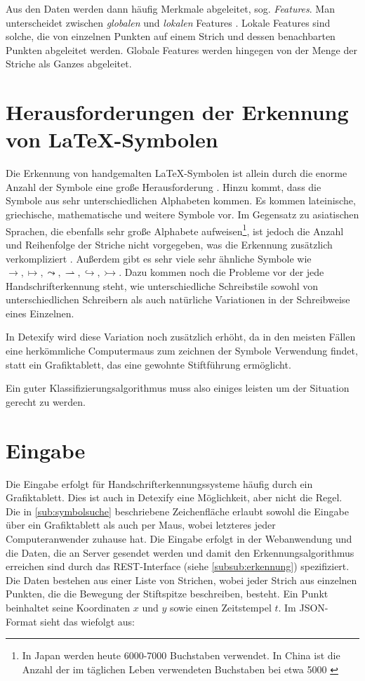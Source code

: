 Aus den Daten werden dann häufig Merkmale abgeleitet, sog. \emph{Features}. Man unterscheidet zwischen \emph{globalen} und \emph{lokalen} Features \cite{Tapia:2007p9160}. Lokale Features sind solche, die von einzelnen Punkten auf einem Strich und dessen benachbarten Punkten abgeleitet werden. Globale Features werden hingegen von der Menge der Striche als Ganzes abgeleitet.

\section[Herausforderungen]{Herausforderungen der Erkennung von \LaTeX-Symbolen}\label{sec:herausforderungen} Die Erkennung von handgemalten \LaTeX-Symbolen ist allein durch die enorme Anzahl der Symbole eine große Herausforderung \cite{Koerich:2003p1562}. Hinzu kommt, dass die Symbole aus sehr unterschiedlichen Alphabeten kommen. Es kommen lateinische, griechische, mathematische und weitere Symbole vor. Im Gegensatz zu asiatischen Sprachen, die ebenfalls sehr große Alphabete aufweisen\footnote{In Japan werden heute 6000-7000 Buchstaben verwendet. In China ist die Anzahl der im täglichen Leben verwendeten Buchstaben bei etwa 5000 \cite{Jaeger:2003p1097}}, ist jedoch die Anzahl und Reihenfolge der Striche nicht vorgegeben, was die Erkennung zusätzlich verkompliziert \cite{Watt:2005p1816}. Außerdem gibt es sehr viele sehr ähnliche Symbole wie $\rightarrow,\mapsto,\leadsto,\rightharpoonup,\hookrightarrow,\rightarrowtail$. Dazu kommen noch die Probleme vor der jede Handschrifterkennung steht, wie unterschiedliche Schreibstile sowohl von unterschiedlichen Schreibern als auch natürliche Variationen in der Schreibweise eines Einzelnen.

In Detexify wird diese Variation noch zusätzlich erhöht, da in den meisten Fällen eine herkömmliche Computermaus zum zeichnen der Symbole Verwendung findet, statt ein Grafiktablett, das eine gewohnte Stiftführung ermöglicht.

Ein guter Klassifizierungsalgorithmus muss also einiges leisten um der Situation gerecht zu werden.

\section{Eingabe} \label{sec:input}

Die Eingabe erfolgt für Handschrifterkennungssysteme häufig durch ein Grafiktablett. Dies ist auch in Detexify eine Möglichkeit, aber nicht die Regel. Die in \ref{sub:symbolsuche} beschriebene Zeichenfläche erlaubt sowohl die Eingabe über ein Grafiktablett als auch per Maus, wobei letzteres jeder Computeranwender zuhause hat. Die Eingabe erfolgt in der Webanwendung und die Daten, die an Server gesendet werden und damit den Erkennungsalgorithmus erreichen sind durch das \ac{REST}-Interface (siehe \ref{subsub:erkennung}) spezifiziert. Die Daten bestehen aus einer Liste von Strichen, wobei jeder Strich aus einzelnen Punkten, die die Bewegung der Stiftspitze beschreiben, besteht. Ein Punkt beinhaltet seine Koordinaten $x$ und $y$ sowie einen Zeitstempel $t$. Im \ac{JSON}-Format sieht das wiefolgt aus:


